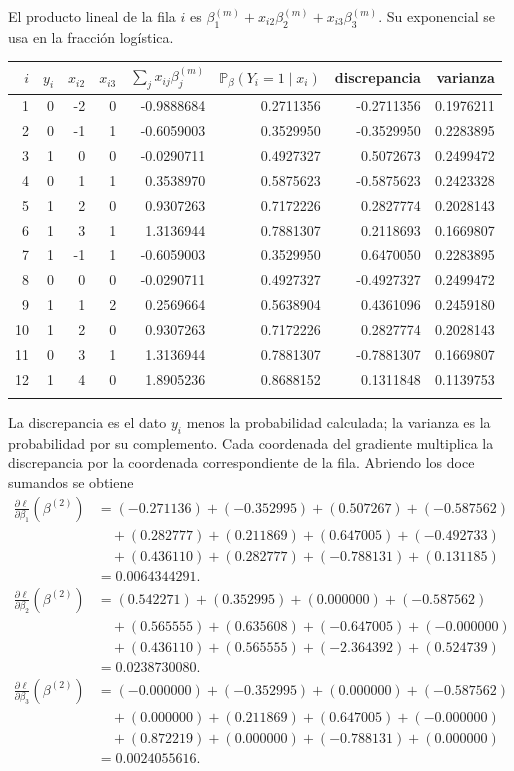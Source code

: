 \documentclass[11pt,a4paper]{article}
\newcommand{\Prob}{\mathbb P}
\begin{document}
El producto lineal de la fila \(i\) es
\(\beta_1^{(m)}+x_{i2}\beta_2^{(m)}+x_{i3}\beta_3^{(m)}\).
Su exponencial se usa en la fracción logística.
\begin{center}\scriptsize
\begin{tabular}{rrrrrrrr}\toprule
\(i\)&\(y_i\)&\(x_{i2}\)&\(x_{i3}\)&\(\sum_jx_{ij}\beta_j^{(m)}\)&\(\Prob_\beta(Y_i=1\mid x_i)\)&discrepancia&varianza\\\midrule
1&0&-2&0&-0.9888684&0.2711356&-0.2711356&0.1976211\\
2&0&-1&1&-0.6059003&0.3529950&-0.3529950&0.2283895\\
3&1&0&0&-0.0290711&0.4927327&0.5072673&0.2499472\\
4&0&1&1&0.3538970&0.5875623&-0.5875623&0.2423328\\
5&1&2&0&0.9307263&0.7172226&0.2827774&0.2028143\\
6&1&3&1&1.3136944&0.7881307&0.2118693&0.1669807\\
7&1&-1&1&-0.6059003&0.3529950&0.6470050&0.2283895\\
8&0&0&0&-0.0290711&0.4927327&-0.4927327&0.2499472\\
9&1&1&2&0.2569664&0.5638904&0.4361096&0.2459180\\
10&1&2&0&0.9307263&0.7172226&0.2827774&0.2028143\\
11&0&3&1&1.3136944&0.7881307&-0.7881307&0.1669807\\
12&1&4&0&1.8905236&0.8688152&0.1311848&0.1139753\\
\\\bottomrule\end{tabular}\end{center}
La discrepancia es el dato \(y_i\) menos la probabilidad
calculada; la varianza es la probabilidad por su complemento.
Cada coordenada del gradiente multiplica la discrepancia por
la coordenada correspondiente de la fila. Abriendo los doce
sumandos se obtiene
\[
\begin{aligned}
\frac{\partial\ell}{\partial\beta_1}(\beta^{(2)})&=(-0.271136)+(-0.352995)+(0.507267)+(-0.587562)\\&\quad+(0.282777)+(0.211869)+(0.647005)+(-0.492733)\\&\quad+(0.436110)+(0.282777)+(-0.788131)+(0.131185)\\&=0.0064344291.\end{aligned}
\]
\[
\begin{aligned}
\frac{\partial\ell}{\partial\beta_2}(\beta^{(2)})&=(0.542271)+(0.352995)+(0.000000)+(-0.587562)\\&\quad+(0.565555)+(0.635608)+(-0.647005)+(-0.000000)\\&\quad+(0.436110)+(0.565555)+(-2.364392)+(0.524739)\\&=0.0238730080.\end{aligned}
\]
\[
\begin{aligned}
\frac{\partial\ell}{\partial\beta_3}(\beta^{(2)})&=(-0.000000)+(-0.352995)+(0.000000)+(-0.587562)\\&\quad+(0.000000)+(0.211869)+(0.647005)+(-0.000000)\\&\quad+(0.872219)+(0.000000)+(-0.788131)+(0.000000)\\&=0.0024055616.\end{aligned}
\]
\end{document}
